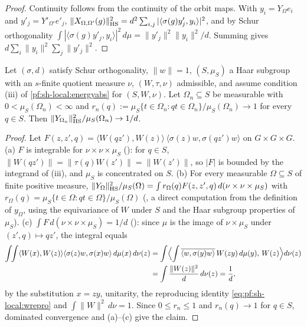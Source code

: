 \begin{proof}
Continuity follows from the continuity of the orbit maps. With $y_i=Y_\Omega e_i$ and $y'_j=Y'_{\Omega'}e'_j$,
$\|X_{\Omega,\Omega'}(g)\|_{\mathrm{HS}}^2=d^2\sum_{i,j}|\langle\sigma(g)y'_j,y_i\rangle|^2$, and by Schur orthogonality
$\int|\langle\sigma(g)y'_j,y_i\rangle|^2\,d\mu=\|y'_j\|^2\|y_i\|^2/d$. Summing gives
$d\sum_i\|y_i\|^2\sum_j\|y'_j\|^2$.
\end{proof}

\begin{lemma}\label{pf:sh-local:folnerlimit}
Let $(\sigma,d)$ satisfy Schur orthogonality, $\|w\|=1$, $(S,\mu_S)$ a Haar subgroup with an $s$-finite quotient
measure $\nu$, $(W,\tau,\nu)$ admissible, and assume condition (iii) of \cref{pf:sh-local:energyabs} for
$(S,W,\nu)$. Let $\Omega_n\subseteq S$ be measurable with $0<\mu_S(\Omega_n)<\infty$ and
$r_n(q):=\mu_S\{t\in\Omega_n:qt\in\Omega_n\}/\mu_S(\Omega_n)\to1$ for every $q\in S$. Then
$\|Y_{\Omega_n}\|_{\mathrm{HS}}^2/\mu_S(\Omega_n)\to1/d$.
\end{lemma}

\begin{proof}
Let $F(z,z',q)=\langle W(qz'),W(z)\rangle\,\langle\sigma(z)w,\sigma(qz')w\rangle$ on $G\times G\times G$.
(a) $F$ is integrable for $\nu\times\nu\times\mu_S$ (): for
$q\in S$, $\|W(qz')\|=\|\tau(q)W(z')\|=\|W(z')\|$, so $|F|$ is bounded by the integrand of (iii), and $\mu_S$ is
concentrated on $S$. (b) For every measurable $\Omega\subseteq S$ of finite positive measure,
$\|Y_\Omega\|_{\mathrm{HS}}^2/\mu_S(\Omega)=\int r_\Omega(q)F(z,z',q)\,d(\nu\times\nu\times\mu_S)$ with
$r_\Omega(q)=\mu_S\{t\in\Omega:qt\in\Omega\}/\mu_S(\Omega)$ (, a
direct computation from the definition of $y_\Omega$, using the equivariance of $W$ under $S$ and the Haar subgroup
properties of $\mu_S$). (c) $\int F\,d(\nu\times\nu\times\mu_S)=1/d$ (): since
$\mu$ is the image of $\nu\times\mu_S$ under $(z',q)\mapsto qz'$, the integral equals
\begin{align*}
\int\!\!\int\langle W(x),W(z)\rangle\langle\sigma(z)w,\sigma(x)w\rangle\,d\mu(x)\,d\nu(z)
&=\int\Bigl\langle\int\overline{\langle w,\sigma(y)w\rangle}\,W(zy)\,d\mu(y),\,W(z)\Bigr\rangle d\nu(z)\\
&=\int\frac{\|W(z)\|^2}d\,d\nu(z)=\frac1d,
\end{align*}
by the substitution $x=zy$, unitarity, the reproducing identity \eqref{eq:pf:sh-local:wrepro} and
$\int\|W\|^2\,d\nu=1$. Since $0\le r_n\le1$ and $r_n(q)\to1$ for $q\in S$, dominated convergence and (a)--(c) give the
claim.
\end{proof}

